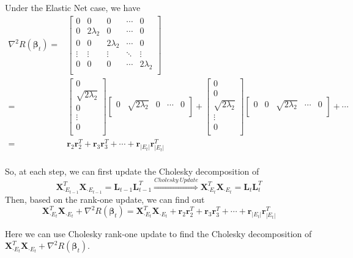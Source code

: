 \documentclass[letter]{article}
\begin{document}
	Under the Elastic Net case, we have
	$$\begin{aligned}
	\nabla^2R(\bm{\beta}_{t})=&
	\begin{bmatrix}
	0 & 0 & 0 & \cdots & 0 \\
	0 & 2\lambda_2 & 0 & \cdots & 0 \\
	0 & 0 & 2\lambda_2 & \cdots & 0 \\
	\vdots & \vdots & \vdots & \ddots & \vdots \\
	0 & 0 & 0 & \cdots & 2\lambda_2 \\
	\end{bmatrix} \\
	=&\begin{bmatrix}
	0 \\
	\sqrt{2\lambda_2} \\
	0 \\
	\vdots \\
	0 \\
	\end{bmatrix}\begin{bmatrix}
	0 & \sqrt{2\lambda_2} & 0 & \cdots & 0 \\
	\end{bmatrix}+
	\begin{bmatrix}
	0 \\
	0 \\
	\sqrt{2\lambda_2} \\
	\vdots \\
	0 \\
	\end{bmatrix}\begin{bmatrix}
	0 & 0 & \sqrt{2\lambda_2} & \cdots & 0 \\
	\end{bmatrix}+\cdots \\
	=&\bm{r}_2\bm{r}_2^T+\bm{r}_3\bm{r}_3^T+\cdots+\bm{r}_{|E_t|}\bm{r}_{|E_t|}^T\\
	\end{aligned}$$
	
	So, at each step, we can first update the Cholesky decomposition of 
	$$\bm{X}_{\cdot E_{t-1}}^T\bm{X}_{\cdot E_{t-1}}
	=\bm{L}_{t-1}\bm{L}_{t-1}^T
	\overset{Cholesky\ Update}{\Longrightarrow}\bm{X}_{\cdot E_{t}}^T\bm{X}_{\cdot E_{t}}
	=\bm{L}_{t}\bm{L}_{t}^T$$
	Then, based on the rank-one update, we can find out
	$$\bm{X}_{\cdot E_{t}}^T\bm{X}_{\cdot E_{t}}
	+\nabla^2R(\bm{\beta}_{t})=
	\bm{X}_{\cdot E_{t}}^T\bm{X}_{\cdot E_{t}}
	+\bm{r}_2\bm{r}_2^T+\bm{r}_3\bm{r}_3^T
	+\cdots+\bm{r}_{|E_t|}\bm{r}_{|E_t|}^T$$
	
	Here we can use Cholesky rank-one update to find the Cholesky decomposition of $\bm{X}_{\cdot E_{t}}^T\bm{X}_{\cdot E_{t}}
	+\nabla^2R(\bm{\beta}_{t})$.
	
	
\end{document}
